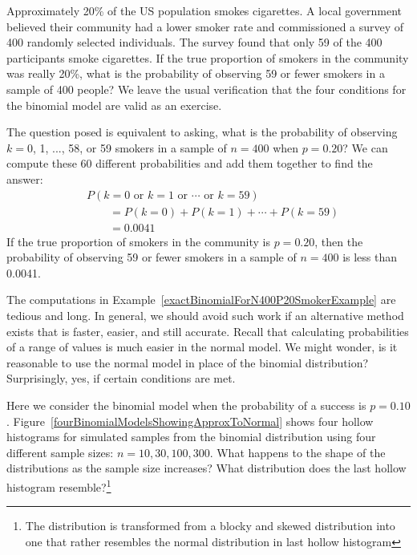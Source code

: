 \begin{example}{Approximately 20\% of the US population smokes cigarettes. A local government believed their community had a lower smoker rate and commissioned a survey of 400 randomly selected individuals. The survey found that only 59 of the 400 participants smoke cigarettes. If the true proportion of smokers in the community was really 20\%, what is the probability of observing 59 or fewer smokers in a sample of 400 people?}\label{exactBinomialForN400P20SmokerExample}
We leave the usual verification that the four conditions for the binomial model are valid as an exercise.

The question posed is equivalent to asking, what is the probability of observing $k=0$, 1, ..., 58, or 59 smokers in a sample of $n=400$ when $p=0.20$? We can compute these 60 different probabilities and add them together to find the answer:
\begin{align*}
&P(k=0\text{ or }k=1\text{ or }\cdots\text{ or } k=59) \\
	&\qquad= P(k=0) + P(k=1) + \cdots + P(k=59) \\
	&\qquad=0.0041
\end{align*}
If the true proportion of smokers in the community is $p=0.20$, then the probability of observing 59 or fewer smokers in a sample of $n=400$ is less than 0.0041.
\end{example}

The computations in Example~\ref{exactBinomialForN400P20SmokerExample} are tedious and long. In general, we should avoid such work if an alternative method exists that is faster, easier, and still accurate. Recall that calculating probabilities of a range of values is much easier in the normal model. We might wonder, is it reasonable to use the normal model in place of the binomial distribution? Surprisingly, yes, if certain conditions are met.

\begin{exercise}
Here we consider the binomial model when the probability of a success is $p=0.10$. Figure~\ref{fourBinomialModelsShowingApproxToNormal} shows four hollow histograms for simulated samples from the binomial distribution using four different sample sizes: $n=10, 30, 100, 300$. What happens to the shape of the distributions as the sample size increases? What distribution does the last hollow histogram resemble?\footnote{The distribution is transformed from a blocky and skewed distribution into one that rather resembles the normal distribution in last hollow histogram}
\end{exercise}

